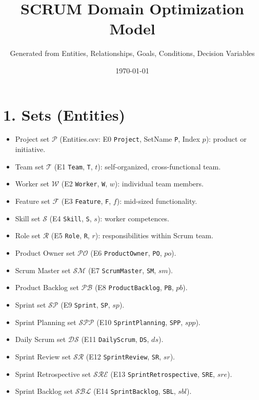 \documentclass[11pt,a4paper]{article}
\title{SCRUM Domain Optimization Model}
\author{Generated from Entities, Relationships, Goals, Conditions, Decision Variables}
\date{\today}
\begin{document}
\maketitle
\tableofcontents
\newpage

\section{1. Sets (Entities)}
\begin{itemize}[leftmargin=2em]
  \item Project set $\mathcal{P}$ (Entities.csv: E0 \texttt{Project}, SetName \texttt{P}, Index $p$): product or initiative.
  \item Team set $\mathcal{T}$ (E1 \texttt{Team}, \texttt{T}, $t$): self-organized, cross-functional team.
  \item Worker set $\mathcal{W}$ (E2 \texttt{Worker}, \texttt{W}, $w$): individual team members.
  \item Feature set $\mathcal{F}$ (E3 \texttt{Feature}, \texttt{F}, $f$): mid-sized functionality.
  \item Skill set $\mathcal{S}$ (E4 \texttt{Skill}, \texttt{S}, $s$): worker competences.
  \item Role set $\mathcal{R}$ (E5 \texttt{Role}, \texttt{R}, $r$): responsibilities within Scrum team.
  \item Product Owner set $\mathcal{PO}$ (E6 \texttt{ProductOwner}, \texttt{PO}, $po$).
  \item Scrum Master set $\mathcal{SM}$ (E7 \texttt{ScrumMaster}, \texttt{SM}, $sm$).
  \item Product Backlog set $\mathcal{PB}$ (E8 \texttt{ProductBacklog}, \texttt{PB}, $pb$).
  \item Sprint set $\mathcal{SP}$ (E9 \texttt{Sprint}, \texttt{SP}, $sp$).
  \item Sprint Planning set $\mathcal{SPP}$ (E10 \texttt{SprintPlanning}, \texttt{SPP}, $spp$).
  \item Daily Scrum set $\mathcal{DS}$ (E11 \texttt{DailyScrum}, \texttt{DS}, $ds$).
  \item Sprint Review set $\mathcal{SR}$ (E12 \texttt{SprintReview}, \texttt{SR}, $sr$).
  \item Sprint Retrospective set $\mathcal{SRE}$ (E13 \texttt{SprintRetrospective}, \texttt{SRE}, $sre$).
  \item Sprint Backlog set $\mathcal{SBL}$ (E14 \texttt{SprintBacklog}, \texttt{SBL}, $sbl$).

\end{itemize}
\end{document}
